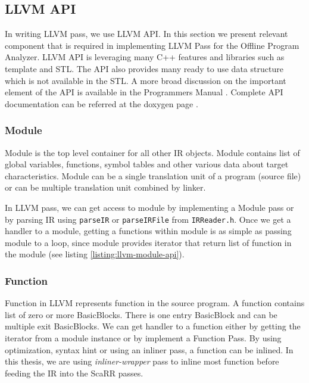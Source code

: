 \subsection{LLVM API}

In writing LLVM pass, we use LLVM API. In this section we present relevant component that is required in implementing LLVM Pass for the Offline Program Analyzer. LLVM API is leveraging many C++ features and libraries such as template and STL. The API also provides many ready to use data structure which is not available in the STL. A more broad discussion on the important element of the API is available in the Programmers Manual \cite{LLVMProgrammerManuala}. Complete API documentation can be referred at the doxygen page \cite{LLVMLLVMa}.

\subsubsection{Module}

Module is the top level container for all other IR objects. Module contains list of global variables, functions, symbol tables and other various data about target characteristics. Module can be a single translation unit of a program (source file) or can be multiple translation unit combined by linker. 

In LLVM pass, we can get access to module by implementing a Module pass or by parsing IR using \texttt{parseIR} or \texttt{parseIRFile} from \texttt{IRReader.h}. Once we get a handler to a module, getting a functions within module is as simple as passing module to a loop, since module provides iterator that return list of function in the module (see listing \ref{listing:llvm-module-api}).


\subsubsection{Function}

Function in LLVM represents function in the source program. A function contains list of zero or more BasicBlocks. There is one entry BasicBlock and can be multiple exit BasicBlocks. We can get handler to a function either by getting the iterator from a module instance or by implement a Function Pass. By using optimization, syntax hint or using an inliner pass, a function can be inlined. In this thesis, we are using \emph{inliner-wrapper} pass to inline most function before feeding the IR into the ScaRR passes.

